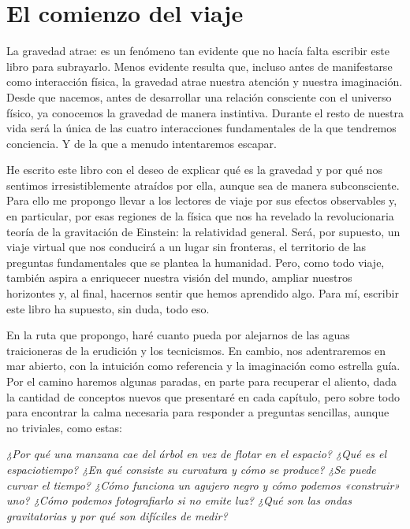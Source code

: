 \chapter*{El comienzo del viaje}\label{introduction}

La gravedad atrae: es un fenómeno tan evidente que no hacía falta escribir este libro para subrayarlo. Menos evidente resulta que, incluso antes de manifestarse como interacción física, la gravedad atrae nuestra atención y nuestra imaginación. Desde que nacemos, antes de desarrollar una relación consciente con el universo físico, ya conocemos la gravedad de manera instintiva. Durante el resto de nuestra vida será la única de las cuatro interacciones fundamentales de la que tendremos conciencia. Y de la que a menudo intentaremos escapar.

He escrito este libro con el deseo de explicar qué es la gravedad y por qué nos sentimos irresistiblemente atraídos por ella, aunque sea de manera subconsciente. Para ello me propongo llevar a los lectores de viaje por sus efectos observables y, en particular, por esas regiones de la física que nos ha revelado la revolucionaria teoría de la gravitación de Einstein: la relatividad general. Será, por supuesto, un viaje virtual que nos conducirá a un lugar sin fronteras, el territorio de las preguntas fundamentales que se plantea la humanidad. Pero, como todo viaje, también aspira a enriquecer nuestra visión del mundo, ampliar nuestros horizontes y, al final, hacernos sentir que hemos aprendido algo. Para mí, escribir este libro ha supuesto, sin duda, todo eso.

En la ruta que propongo, haré cuanto pueda por alejarnos de las aguas traicioneras de la erudición y los tecnicismos. En cambio, nos adentraremos en mar abierto, con la intuición como referencia y la imaginación como estrella guía. Por el camino haremos algunas paradas, en parte para recuperar el aliento, dada la cantidad de conceptos nuevos que presentaré en cada capítulo, pero sobre todo para encontrar la calma necesaria para responder a preguntas sencillas, aunque no triviales, como estas:

\emph{¿Por qué una manzana cae del árbol en vez de flotar en el espacio? ¿Qué es el espaciotiempo? ¿En qué consiste su curvatura y cómo se produce? ¿Se puede curvar el tiempo? ¿Cómo funciona un agujero negro y cómo podemos «construir» uno? ¿Cómo podemos fotografiarlo si no emite luz? ¿Qué son las ondas gravitatorias y por qué son difíciles de medir?}

